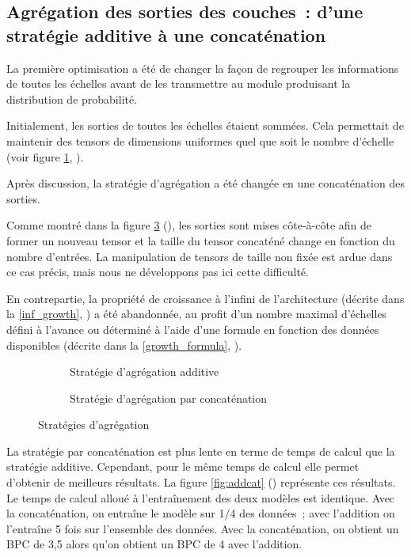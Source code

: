 \subsection[Agrégation des sorties des couches]{Agrégation des sorties des couches~: d'une stratégie additive à une concaténation}\label{subsec:addcat_}
La première optimisation a été de changer la façon de regrouper les informations de toutes les \og échelles\fg{} avant de les transmettre au module produisant la distribution de probabilité.

Initialement, les sorties de toutes les \og échelles\fg{} étaient sommées. Cela permettait de maintenir des \glspl{tensor} de dimensions uniformes quel que soit le nombre d'\og échelle\fg{} (voir figure \ref{fig:add}, ).

Après discussion, la stratégie d'agrégation a été changée en une concaténation des sorties.

Comme montré dans la figure \ref{fig:cat} (), les sorties sont mises côte-à-côte afin de former un nouveau \gls{tensor} et la taille du \gls{tensor} concaténé change en fonction du nombre d'entrées.
La manipulation de \glspl{tensor} de taille non fixée est ardue dans ce cas précis, mais nous ne développons pas ici cette difficulté.

En contrepartie, la propriété de croissance à l'infini de l'architecture (décrite dans la \autoref{inf_growth}, ) a été abandonnée, au profit d'un nombre maximal d'échelles défini à l'avance ou déterminé à l'aide d'une formule en fonction des données disponibles (décrite dans la \mbox{\autoref{growth_formula}}, ).

\begin{figure}[ht]
	\begin{subfigure}{0.45\textwidth}
		\centering
		\scalebox{1}{}
		\caption[Stratégie d'agrégation additive]{Stratégie d'agrégation additive}\label{fig:add}
	\end{subfigure}
	\begin{subfigure}{0.45\textwidth}
		\centering
		\scalebox{1}{}
		\caption[Stratégie d'agrégation par concaténation]{Stratégie d'agrégation par concaténation}\label{fig:cat}
	\end{subfigure} 
	\caption{Stratégies d'agrégation}
\end{figure}

La stratégie par concaténation est plus lente en terme de temps de calcul que la stratégie additive. Cependant, pour le même temps de calcul elle permet d'obtenir de meilleurs résultats. La figure \ref{fig:addcat} () représente ces résultats. Le temps de calcul alloué à l'entraînement des deux modèles est identique. Avec la concaténation, on entraîne le modèle sur 1/4 des données~; avec l'addition on l'entraîne 5 fois sur l'ensemble des données. Avec la concaténation, on obtient un BPC de 3,5 alors qu'on obtient un BPC de 4 avec l'addition.

